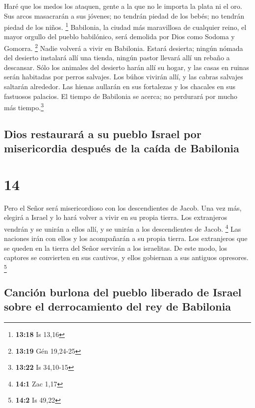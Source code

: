  Haré que los medos los ataquen, gente a la que no le
importa la plata ni el oro.  Sus arcos masacrarán a sus
jóvenes; no tendrán piedad de los bebés; no tendrán piedad de los niños.
\footnote{\textbf{13:18} Is 13,16}  Babilonia, la ciudad
más maravillosa de cualquier reino, el mayor orgullo del pueblo
babilónico, será demolida por Dios como Sodoma y Gomorra. \footnote{\textbf{13:19}
  Gén 19,24-25}  Nadie volverá a vivir en Babilonia.
Estará desierta; ningún nómada del desierto instalará allí una tienda,
ningún pastor llevará allí un rebaño a descansar.  Sólo
los animales del desierto harán allí su hogar, y las casas en ruinas
serán habitadas por perros salvajes. Los búhos vivirán allí, y las
cabras salvajes saltarán alrededor.  Las hienas aullarán
en sus fortalezas y los chacales en sus fastuosos palacios. El tiempo de
Babilonia se acerca; no perdurará por mucho más tiempo.\footnote{\textbf{13:22}
  Is 34,10-15}

\hypertarget{dios-restauraruxe1-a-su-pueblo-israel-por-misericordia-despuuxe9s-de-la-cauxedda-de-babilonia}{%
\subsection{Dios restaurará a su pueblo Israel por misericordia después
de la caída de
Babilonia}\label{dios-restauraruxe1-a-su-pueblo-israel-por-misericordia-despuuxe9s-de-la-cauxedda-de-babilonia}}

\hypertarget{section-13}{%
\section{14}\label{section-13}}

 Pero el Señor será misericordioso con los descendientes
de Jacob. Una vez más, elegirá a Israel y lo hará volver a vivir en su
propia tierra. Los extranjeros vendrán y se unirán a ellos allí, y se
unirán a los descendientes de Jacob. \footnote{\textbf{14:1} Zac 1,17}
 Las naciones irán con ellos y los acompañarán a su propia
tierra. Los extranjeros que se queden en la tierra del Señor servirán a
los israelitas. De este modo, los captores se convierten en sus
cautivos, y ellos gobiernan a sus antiguos opresores. \footnote{\textbf{14:2}
  Is 49,22}

\hypertarget{canciuxf3n-burlona-del-pueblo-liberado-de-israel-sobre-el-derrocamiento-del-rey-de-babilonia}{%
\subsection{Canción burlona del pueblo liberado de Israel sobre el
derrocamiento del rey de
Babilonia}\label{canciuxf3n-burlona-del-pueblo-liberado-de-israel-sobre-el-derrocamiento-del-rey-de-babilonia}}


